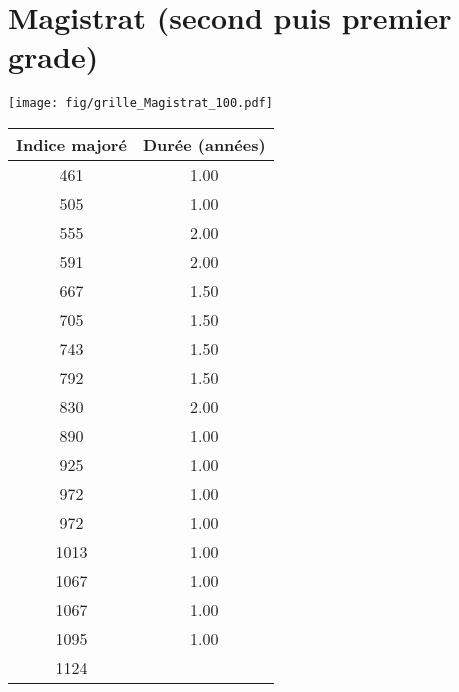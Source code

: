 \newpage 
 
\chapter{Magistrat (second puis premier grade)} 

\begin{minipage}{0.55\linewidth}\texttt{[image: fig/grille\_Magistrat\_100.pdf]}\end{minipage} 
\begin{minipage}{0.3\linewidth} 
 \begin{center} 

\begin{tabular}[htb]{|c|c|} 
\hline 
 Indice majoré &  Durée (années) \\ 
\hline \hline 
 461 &  1.00 \\ 
\hline 
 505 &  1.00 \\ 
\hline 
 555 &  2.00 \\ 
\hline 
 591 &  2.00 \\ 
\hline 
 667 &  1.50 \\ 
\hline 
 705 &  1.50 \\ 
\hline 
 743 &  1.50 \\ 
\hline 
 792 &  1.50 \\ 
\hline 
 830 &  2.00 \\ 
\hline 
 890 &  1.00 \\ 
\hline 
 925 &  1.00 \\ 
\hline 
 972 &  1.00 \\ 
\hline 
 972 &  1.00 \\ 
\hline 
 1013 &  1.00 \\ 
\hline 
 1067 &  1.00 \\ 
\hline 
 1067 &  1.00 \\ 
\hline 
 1095 &  1.00 \\ 
\hline 
 1124 &   \\ 
\hline 
\hline 
\end{tabular} 
\end{center} 
 \end{minipage} 

~\\ 
 


   
 \localtableofcontents 

